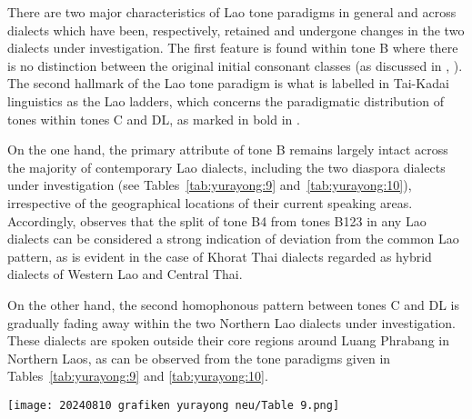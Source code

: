 \documentclass[output=paper]{langscibook}
\begin{document}
\clearpage
There are two major characteristics of Lao tone paradigms in general and across dialects which have been, respectively, retained and undergone changes in the two dialects under investigation. The first feature is found within tone B where there is no distinction between the original initial consonant classes (as discussed in , ). The second hallmark of the Lao tone paradigm is what is labelled in Tai-Kadai linguistics as the Lao ladders, which concerns the paradigmatic distribution of tones within tones C and DL, as marked in bold in .

On the one hand, the primary attribute of tone B remains largely intact across the majority of contemporary Lao dialects, including the two diaspora dialects under investigation (see Tables~\ref{tab:yurayong:9} and~\ref{tab:yurayong:10}), irrespective of the geographical locations of their current speaking areas. Accordingly, \citet[337]{Akkharawatthanakun2003} observes that the split of tone B4 from tones B123 in any Lao dialects can be considered a strong indication of deviation from the common Lao pattern, as is evident in the case of Khorat Thai dialects regarded as hybrid dialects of Western Lao and Central Thai.

On the other hand, the second homophonous pattern between tones C and DL is gradually fading away within the two Northern Lao dialects under investigation. These dialects are spoken outside their core regions around Luang Phrabang in Northern Laos, as can be observed from the tone paradigms given in Tables~\ref{tab:yurayong:9} and \ref{tab:yurayong:10}.


\begin{table}
\texttt{[image: 20240810 grafiken yurayong neu/Table 9.png]}
\caption{Tone paradigm of the Northern Lao dialect speaker (LN11) in Chiang Khong, Chiang Rai province, Thailand.}
\label{tab:yurayong:9}
\end{table}
\end{document}
